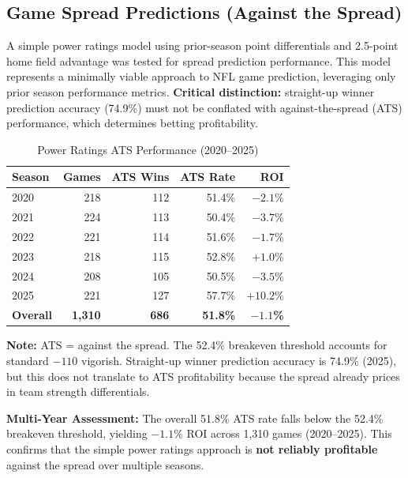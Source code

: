 \subsection{Game Spread Predictions (Against the Spread)}

A simple power ratings model using prior-season point differentials and 2.5-point home field advantage was tested for spread prediction performance. This model represents a minimally viable approach to NFL game prediction, leveraging only prior season performance metrics. \textbf{Critical distinction:} straight-up winner prediction accuracy (74.9\%) must not be conflated with against-the-spread (ATS) performance, which determines betting profitability.

\begin{table}[htbp]
\centering
\caption{Power Ratings ATS Performance (2020--2025)}
\label{tab:spread-holdout-2025}
\begin{tabular}{lrrrr}
\toprule
\textbf{Season} & \textbf{Games} & \textbf{ATS Wins} & \textbf{ATS Rate} & \textbf{ROI} \\
\midrule
2020 & 218 & 112 & 51.4\% & $-2.1$\% \\
2021 & 224 & 113 & 50.4\% & $-3.7$\% \\
2022 & 221 & 114 & 51.6\% & $-1.7$\% \\
2023 & 218 & 115 & 52.8\% & $+1.0$\% \\
2024 & 208 & 105 & 50.5\% & $-3.5$\% \\
2025 & 221 & 127 & 57.7\% & $+10.2$\% \\
\midrule
\textbf{Overall} & \textbf{1,310} & \textbf{686} & \textbf{51.8\%} & $\mathbf{-1.1}$\textbf{\%} \\
\bottomrule
\end{tabular}

\vspace{4pt}
{\footnotesize \textbf{Note:} ATS = against the spread. The 52.4\% breakeven threshold accounts for standard $-110$ vigorish. Straight-up winner prediction accuracy is 74.9\% (2025), but this does not translate to ATS profitability because the spread already prices in team strength differentials.}
\end{table}

\textbf{Multi-Year Assessment:} The overall 51.8\% ATS rate falls below the 52.4\% breakeven threshold, yielding $-1.1$\% ROI across 1,310 games (2020--2025). This confirms that the simple power ratings approach is \textbf{not reliably profitable} against the spread over multiple seasons.

